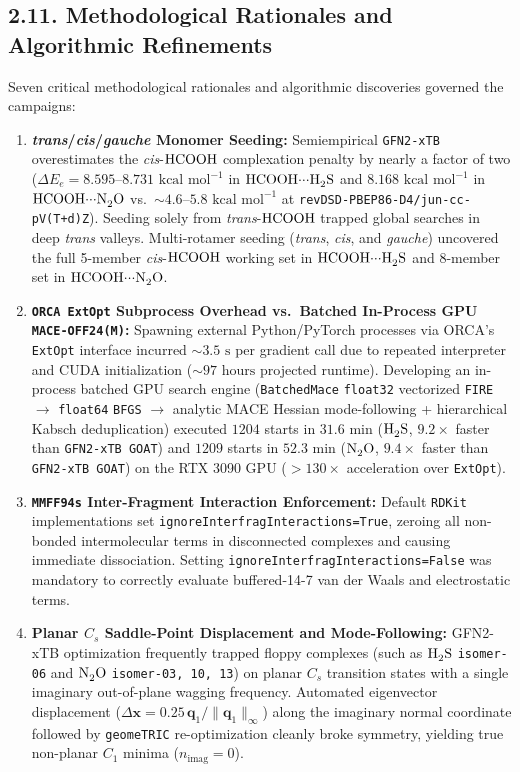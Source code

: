 \documentclass[journal=jpclcd,manuscript=article]{achemso}
\begin{document}
\subsection{2.11. Methodological Rationales and Algorithmic Refinements}
Seven critical methodological rationales and algorithmic discoveries governed the campaigns:
\begin{enumerate}
  \item \textbf{\textit{trans}/\textit{cis}/\textit{gauche} Monomer Seeding:} Semiempirical \texttt{GFN2-xTB} overestimates the \textit{cis}-$\ce{HCOOH}$ complexation penalty by nearly a factor of two ($\Delta E_e = 8.595\text{--}8.731\text{ kcal mol}^{-1}$ in $\ce{HCOOH\bond{...}H2S}$ and $8.168\text{ kcal mol}^{-1}$ in $\ce{HCOOH\bond{...}N2O}$ vs.\ $\sim 4.6\text{--}5.8\text{ kcal mol}^{-1}$ at \texttt{revDSD-PBEP86-D4/jun-cc-pV(T+d)Z}). Seeding solely from \textit{trans}-$\ce{HCOOH}$ trapped global searches in deep \textit{trans} valleys. Multi-rotamer seeding (\textit{trans}, \textit{cis}, and \textit{gauche}) uncovered the full 5-member \textit{cis}-$\ce{HCOOH}$ working set in $\ce{HCOOH\bond{...}H2S}$ and 8-member set in $\ce{HCOOH\bond{...}N2O}$.
  \item \textbf{\texttt{ORCA ExtOpt} Subprocess Overhead vs.\ Batched In-Process GPU \texttt{MACE-OFF24(M)}:} Spawning external Python/PyTorch processes via ORCA's \texttt{ExtOpt} interface incurred $\sim 3.5\text{ s}$ per gradient call due to repeated interpreter and CUDA initialization ($\sim 97\text{ hours}$ projected runtime). Developing an in-process batched GPU search engine (\texttt{BatchedMace} \texttt{float32} vectorized \texttt{FIRE} $\to$ \texttt{float64} \texttt{BFGS} $\to$ analytic MACE Hessian mode-following + hierarchical Kabsch deduplication) executed $1204$ starts in $31.6\text{ min}$ ($\ce{H2S}$, $9.2\times$ faster than \texttt{GFN2-xTB GOAT}) and $1209$ starts in $52.3\text{ min}$ ($\ce{N2O}$, $9.4\times$ faster than \texttt{GFN2-xTB GOAT}) on the RTX 3090 GPU ($>130\times$ acceleration over \texttt{ExtOpt}).
  \item \textbf{\texttt{MMFF94s} Inter-Fragment Interaction Enforcement:} Default \texttt{RDKit} implementations set \texttt{ignoreInterfragInteractions=True}, zeroing all non-bonded intermolecular terms in disconnected complexes and causing immediate dissociation. Setting \texttt{ignoreInterfragInteractions=False} was mandatory to correctly evaluate buffered-14-7 van der Waals and electrostatic terms.
  \item \textbf{Planar $C_s$ Saddle-Point Displacement and Mode-Following:} GFN2-xTB optimization frequently trapped floppy complexes (such as $\ce{H2S}$ \texttt{isomer-06} and $\ce{N2O}$ \texttt{isomer-03, 10, 13}) on planar $C_s$ transition states with a single imaginary out-of-plane wagging frequency. Automated eigenvector displacement ($\Delta\mathbf{x} = 0.25\,\mathbf{q}_1 / \|\mathbf{q}_1\|_\infty$) along the imaginary normal coordinate followed by \texttt{geomeTRIC} re-optimization cleanly broke symmetry, yielding true non-planar $C_1$ minima ($n_{\mathrm{imag}} = 0$).

\end{enumerate}
\end{document}
